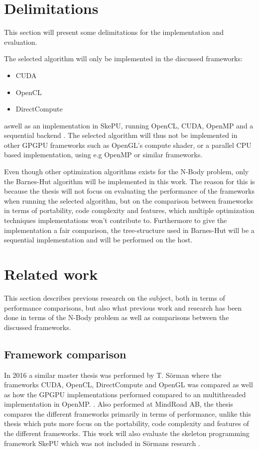 \section{Delimitations}
This section will present some delimitations for the implementation and evaluation.

The selected algorithm will only be implemented in the discussed frameworks:
\begin{itemize}
    \item CUDA
    \item OpenCL
    \item DirectCompute
\end{itemize}

\noindent aswell as an implementation in SkePU, running OpenCL, CUDA, OpenMP and a sequential backend \cite{enmyren2010skepu}. The selected algorithm will thus not be implemented in other GPGPU frameworks such as OpenGL's compute shader, or a parallel CPU based implementation, using e.g OpenMP or similar frameworks.

Even though other optimization algorithms exists for the N-Body problem, only the Barnes-Hut algorithm will be implemented in this work. The reason for this is because the thesis will not focus on evaluating the performance of the frameworks when running the selected algorithm, but on the comparison between frameworks in terms of portability, code complexity and features, which multiple optimization techniques implementations won't contribute to. Furthermore to give the implementation a fair comparison, the tree-structure used in Barnes-Hut will be a sequential implementation and will be performed on the host.

\section{Related work}
This section describes previous research on the subject, both in terms of performance comparisons, but also what previous work and research has been done in terms of the N-Body problem as well as comparisons between the discussed frameworks.


\subsection{Framework comparison}
In 2016 a similar master thesis was performed by T. Sörman where the frameworks CUDA, OpenCL, DirectCompute and OpenGL was compared as well as how the GPGPU implementations performed compared to an multithreaded implementation in OpenMP. \cite{Torbjorn}. Also performed at MindRoad AB, the thesis compares the different frameworks primarily in terms of performance, unlike this thesis which puts more focus on the portability, code complexity and features of the different frameworks. This work will also evaluate the skeleton programming framework SkePU which was not included in Sörmans research \cite{enmyren2010skepu}. 

